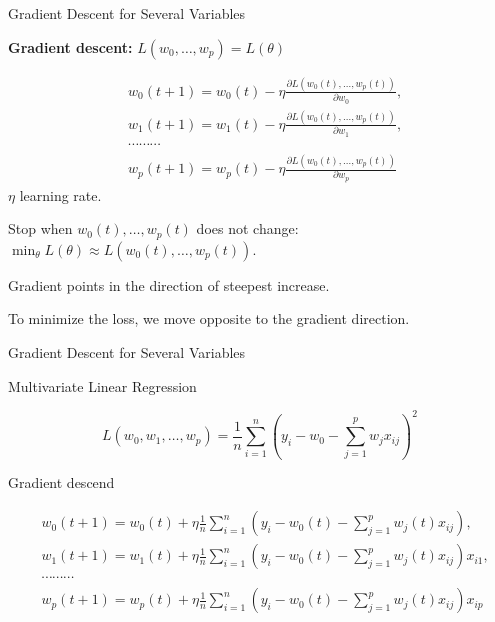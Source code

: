 \documentclass{beamer}
\begin{document}
\begin{frame}{Gradient Descent for Several Variables}

    \textbf{Gradient descent:}
$L(w_0,\ldots, w_p)=L(\theta)$

\[
\begin{split}
& w_0(t+1) = w_0(t) - \eta \frac{\partial L(w_0(t), \ldots, w_p(t))}{\partial w_0}, \\
& w_1(t+1) = w_1(t) - \eta \frac{\partial L(w_0(t), \ldots, w_p(t))}{\partial w_1}, \\
& \cdots \cdots \cdots  \\
& w_p(t+1) = w_p(t) - \eta \frac{\partial L(w_0(t), \ldots, w_p(t))}{\partial w_p}
\end{split}
\]
$\eta$ learning rate. 

\medskip

Stop when $w_0(t),\ldots, w_p(t)$ does not change:
\( \min_{\theta} L(\theta) \approx L(w_0(t), \ldots, w_p    (t)) \).

\medskip 

Gradient points in the direction of steepest increase.

\medskip

To minimize the loss, we move opposite to the gradient direction.


\end{frame}
\begin{frame}{Gradient Descent for Several Variables}

    Multivariate Linear Regression

 \[
   L(w_0, w_1, \ldots, w_p)=\frac{1}{n} \sum_{i=1}^n \left(y_i - w_0 - \sum_{j=1}^p w_j x_{ij}\right)^2
 \]

 Gradient descend

 \[
\begin{split}
& w_0(t+1) = w_0(t) + \eta \frac{1}{n} \sum_{i=1}^n  \left(y_i - w_0(t) - \sum_{j=1}^p w_j(t) x_{ij}\right), \\
& w_1(t+1) = w_1(t) + \eta \frac{1}{n} \sum_{i=1}^n  \left(y_i - w_0(t) - \sum_{j=1}^p w_j(t) x_{ij}\right) x_{i1}, \\
& \cdots \cdots \cdots  \\
& w_p(t+1) = w_p(t) + \eta \frac{1}{n} \sum_{i=1}^n  \left(y_i - w_0(t) - \sum_{j=1}^p w_j(t) x_{ij}\right) x_{ip}
\end{split}
\]

\end{frame}

\end{document}
